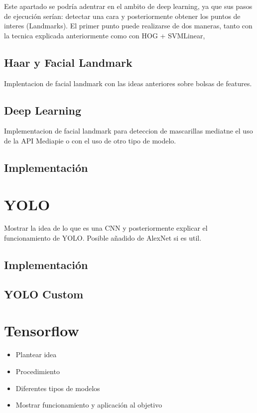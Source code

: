 Este apartado se podría adentrar en el ambito de deep learning, ya que sus pasos de ejecución serían: detectar una cara y posteriormente obtener los puntos de interes (Landmarks). El primer punto puede realizarse de dos maneras, tanto con la tecnica explicada anteriormente como con HOG + SVMLinear,

\subsection*{Haar y Facial Landmark}
Implentacion de facial landmark con las ideas anteriores sobre bolsas de features.

\subsection*{Deep Learning}
Implementacion de facial landmark para deteccion de mascarillas mediatne el uso de la API Mediapie o con el uso de otro tipo de modelo.

\subsection*{Implementación}

\section{YOLO}
Mostrar la idea de lo que es una CNN y posteriormente explicar el funcionamiento de YOLO. Posible añadido de AlexNet si es util.

\subsection*{Implementación}


\subsection*{YOLO Custom}


\section{Tensorflow}

\begin{itemize}
	\item Plantear idea
	\item Procedimiento
	\item Diferentes tipos de modelos
	\item Mostrar funcionamiento y aplicación al objetivo
\end{itemize}
